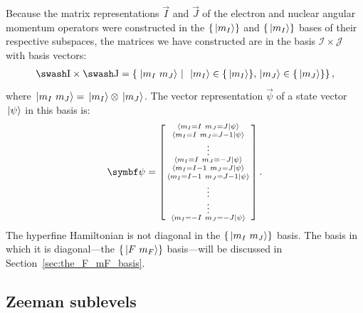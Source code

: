 Because the matrix representations $\vec I$ and $\vec J$ of the electron and nuclear angular momentum operators were constructed in the $\{\ket{m_I}\}$ and $\{\ket{m_I}\}$ bases of their respective subspaces, the matrices we have constructed are in the basis $\mathcal{I}\times\mathcal{J}$ with basis vectors:
\begin{align}
\mathcal{I}\times\mathcal{J} = \left\{\left. \ket{m_I\ m_J} \ \right| \ \ket{m_I} \in \{\ket{m_I}\}, \ket{m_J} \in \{\ket{m_J}\}\right\},
\end{align}
where $\ket{m_I\ m_J} = \ket{m_I} \otimes \ket{m_J}$. The vector representation $\vec\psi$ of a state vector $\ket{\psi}$ in this basis is:
\begin{align}
\vec \psi = \left[\begin{smallmatrix}
\braket{m_I=I\ m_J=J}{\psi}\\
\braket{m_I=I\ m_J=J-1}{\psi}\\
\vdots\\
\braket{m_I=I\ m_J=-J}{\psi}\\
\braket{m_I=I-1\ m_J=J}{\psi}\\
\braket{m_I=I-1\ m_J=J-1}{\psi}\\
\vdots\\
\vdots\\
\braket{m_I=-I\ m_J=-J}{\psi}\\
\end{smallmatrix}\right].
\end{align}
The hyperfine Hamiltonian is not diagonal in the $\{\ket{m_I\ m_J}\}$ basis. The basis in which it is diagonal---the $\{\ket{F\ m_F}\}$ basis---will be discussed in Section~\ref{sec:the_F_mF_basis}.

\subsection{Zeeman sublevels}\label{sec:zeeman_sublevels}

